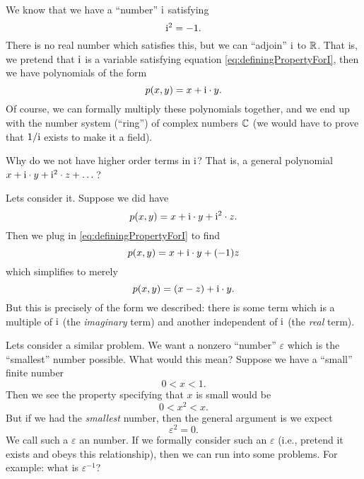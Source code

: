 We know that we have a ``number'' $\mathrm{i}$ satisfying
\begin{equation}
\mathrm{i}^{2}=-1.\label{eq:definingPropertyForI}
\end{equation}
There is no real number which satisfies this, but we can ``adjoin''
$\mathrm{i}$ to $\mathbb{R}$. That is, we pretend that $\mathrm{i}$ is a variable
satisfying equation \eqref{eq:definingPropertyForI}, then we have
polynomials of the form
\begin{equation}
p(x,y)=x+\mathrm{i}\cdot y.
\end{equation}
Of course, we can formally multiply these polynomials together,
and we end up with the number system (``ring'') of complex numbers
$\mathbb{C}$ (we would have to prove that $1/\mathrm{i}$ exists to make it a
field).
\begin{problem}
Why do we not have higher order terms in $\mathrm{i}$? That is, a general
polynomial $x+\mathrm{i}\cdot y+\mathrm{i}^{2}\cdot z + \dots$?
\end{problem}
Lets consider it. Suppose we did have
\begin{equation}
p(x,y)=x+\mathrm{i}\cdot y+\mathrm{i}^{2}\cdot z.
\end{equation}
Then we plug in \eqref{eq:definingPropertyForI} to find
\begin{equation}
p(x,y)=x+\mathrm{i}\cdot y+(-1) z
\end{equation}
which simplifies to merely
\begin{equation}
p(x,y)=(x-z)+\mathrm{i}\cdot y.
\end{equation}
But this is precisely of the form we described: there is some
term which is a multiple of $\mathrm{i}$ (the \emph{imaginary} term) and
another independent of $\mathrm{i}$ (the \emph{real} term).

Lets consider a similar problem. We want a nonzero ``number''
$\varepsilon$ which is the ``smallest'' number possible. What would
this mean? Suppose we have a ``small'' finite number
\begin{equation}
0<x<1.
\end{equation}
Then we see the property specifying that $x$ is small would be
\begin{equation}
0<x^{2}<x.
\end{equation}
But if we had the \emph{smallest} number, then the general
argument is we expect
\begin{equation}
\varepsilon^2=0.
\end{equation}
We call such a $\varepsilon$ an  number.
If we formally consider such an $\varepsilon$ (i.e., pretend it
exists and obeys this relationship), then we can run into some
problems. For example: what is $\varepsilon^{-1}$?


